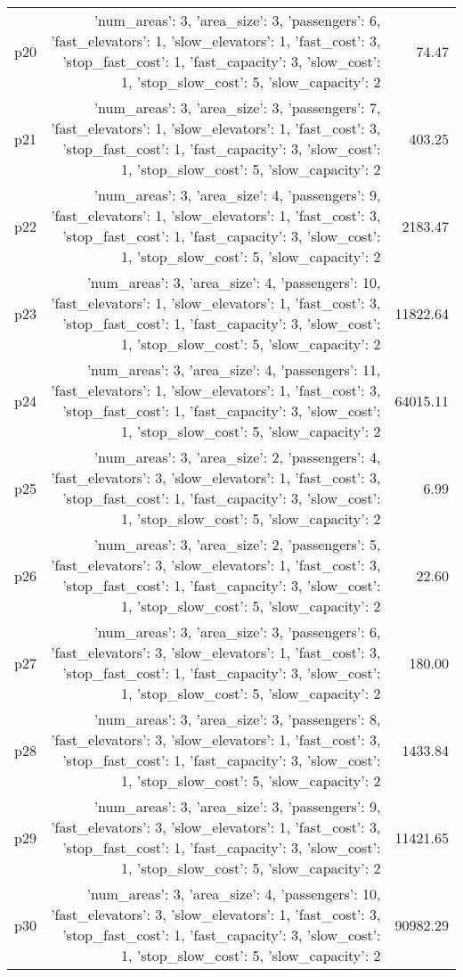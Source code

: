 \documentclass{article}
\begin{document}
\begin{center}
\begin{tabular}{@{}l|r|r@{}}
  p20&{'num\_areas': 3, 'area\_size': 3, 'passengers': 6, 'fast\_elevators': 1, 'slow\_elevators': 1, 'fast\_cost': 3, 'stop\_fast\_cost': 1, 'fast\_capacity': 3, 'slow\_cost': 1, 'stop\_slow\_cost': 5, 'slow\_capacity': 2}&74.47\\
  p21&{'num\_areas': 3, 'area\_size': 3, 'passengers': 7, 'fast\_elevators': 1, 'slow\_elevators': 1, 'fast\_cost': 3, 'stop\_fast\_cost': 1, 'fast\_capacity': 3, 'slow\_cost': 1, 'stop\_slow\_cost': 5, 'slow\_capacity': 2}&403.25\\
  p22&{'num\_areas': 3, 'area\_size': 4, 'passengers': 9, 'fast\_elevators': 1, 'slow\_elevators': 1, 'fast\_cost': 3, 'stop\_fast\_cost': 1, 'fast\_capacity': 3, 'slow\_cost': 1, 'stop\_slow\_cost': 5, 'slow\_capacity': 2}&2183.47\\
  p23&{'num\_areas': 3, 'area\_size': 4, 'passengers': 10, 'fast\_elevators': 1, 'slow\_elevators': 1, 'fast\_cost': 3, 'stop\_fast\_cost': 1, 'fast\_capacity': 3, 'slow\_cost': 1, 'stop\_slow\_cost': 5, 'slow\_capacity': 2}&11822.64\\
  p24&{'num\_areas': 3, 'area\_size': 4, 'passengers': 11, 'fast\_elevators': 1, 'slow\_elevators': 1, 'fast\_cost': 3, 'stop\_fast\_cost': 1, 'fast\_capacity': 3, 'slow\_cost': 1, 'stop\_slow\_cost': 5, 'slow\_capacity': 2}&64015.11\\
  p25&{'num\_areas': 3, 'area\_size': 2, 'passengers': 4, 'fast\_elevators': 3, 'slow\_elevators': 1, 'fast\_cost': 3, 'stop\_fast\_cost': 1, 'fast\_capacity': 3, 'slow\_cost': 1, 'stop\_slow\_cost': 5, 'slow\_capacity': 2}&6.99\\
  p26&{'num\_areas': 3, 'area\_size': 2, 'passengers': 5, 'fast\_elevators': 3, 'slow\_elevators': 1, 'fast\_cost': 3, 'stop\_fast\_cost': 1, 'fast\_capacity': 3, 'slow\_cost': 1, 'stop\_slow\_cost': 5, 'slow\_capacity': 2}&22.60\\
  p27&{'num\_areas': 3, 'area\_size': 3, 'passengers': 6, 'fast\_elevators': 3, 'slow\_elevators': 1, 'fast\_cost': 3, 'stop\_fast\_cost': 1, 'fast\_capacity': 3, 'slow\_cost': 1, 'stop\_slow\_cost': 5, 'slow\_capacity': 2}&180.00\\
  p28&{'num\_areas': 3, 'area\_size': 3, 'passengers': 8, 'fast\_elevators': 3, 'slow\_elevators': 1, 'fast\_cost': 3, 'stop\_fast\_cost': 1, 'fast\_capacity': 3, 'slow\_cost': 1, 'stop\_slow\_cost': 5, 'slow\_capacity': 2}&1433.84\\
  p29&{'num\_areas': 3, 'area\_size': 3, 'passengers': 9, 'fast\_elevators': 3, 'slow\_elevators': 1, 'fast\_cost': 3, 'stop\_fast\_cost': 1, 'fast\_capacity': 3, 'slow\_cost': 1, 'stop\_slow\_cost': 5, 'slow\_capacity': 2}&11421.65\\
  p30&{'num\_areas': 3, 'area\_size': 4, 'passengers': 10, 'fast\_elevators': 3, 'slow\_elevators': 1, 'fast\_cost': 3, 'stop\_fast\_cost': 1, 'fast\_capacity': 3, 'slow\_cost': 1, 'stop\_slow\_cost': 5, 'slow\_capacity': 2}&90982.29
                            \end{tabular}
                            \end{center}
                    
\end{document}
